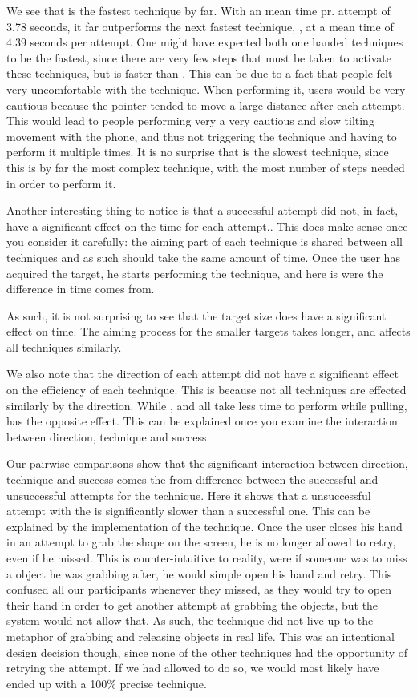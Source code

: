We see that \swipe is the fastest technique by far.
With an mean time pr. attempt of 3.78 seconds, it far outperforms the next fastest technique, \throw, at a mean time of 4.39 seconds per attempt. 
One might have expected both one handed techniques to be the fastest, since there are very few steps that must be taken to activate these techniques, but \throw is faster than \tilt. 
This can be due to a fact that people felt very uncomfortable with the \tilt technique.
When performing it, users would be very cautious because the pointer tended to move a large distance after each attempt.
This would lead to people performing very a very cautious and slow tilting movement with the phone, and thus not triggering the technique and having to perform it multiple times. 
It is no surprise that \grab is the slowest technique, since this is by far the most complex technique, with the most number of steps needed in order to perform it.

Another interesting thing to notice is that a successful attempt did not, in fact, have a significant effect on the time for each attempt.. 
This does make sense once you consider it carefully: the aiming part of each technique is shared between all techniques and as such should take the same amount of time.
Once the user has acquired the target, he starts performing the technique, and here is were the difference in time comes from.

As such, it is not surprising to see that the target size does have a significant effect on time.
The aiming process for the smaller targets takes longer, and affects all techniques similarly.

We also note that the direction of each attempt did not have a significant effect on the efficiency of each technique. 
This is because not all techniques are effected similarly by the direction. 
While \swipe, \throw and \tilt all take less time to perform while pulling, \grab has the opposite effect.
This can be explained once you examine the interaction between direction, technique and success.

Our pairwise comparisons show that the significant interaction between direction, technique and success comes the from difference between the successful and unsuccessful attempts for the \grab \pull technique. 
Here it shows that a unsuccessful attempt with the \grab \pull is significantly slower than a successful one. 
This can be explained by the implementation of the technique. 
Once the user closes his hand in an attempt to grab the shape on the screen, he is no longer allowed to retry, even if he missed.
This is counter-intuitive to reality, were if someone was to miss a object he was grabbing after, he would simple open his hand and retry.
This confused all our participants whenever they missed, as they would try to open their hand in order to get another attempt at grabbing the objects, but the system would not allow that.
As such, the \grab \pull technique did not live up to the metaphor of grabbing and releasing objects in real life.
This was an intentional design decision though, since none of the other techniques had the opportunity  of retrying the attempt.
If we had allowed \grab \pull to do so, we would most likely have ended up with a 100\% precise technique. 

